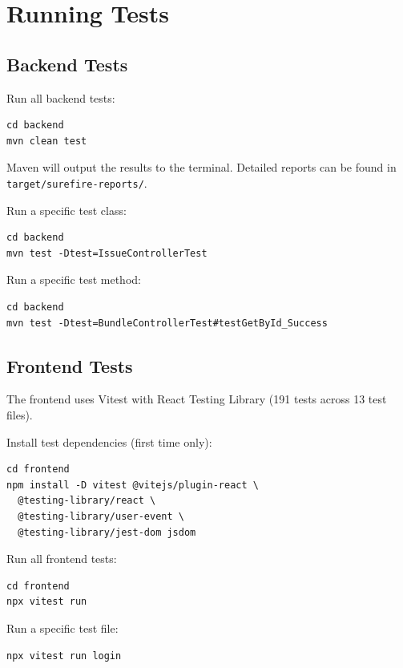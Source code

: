 \documentclass[a4paper,11pt]{article}
\begin{document}
\section{Running Tests}

\subsection{Backend Tests}

Run all backend tests:

\begin{lstlisting}
cd backend
mvn clean test
\end{lstlisting}

Maven will output the results to the terminal. Detailed reports can be found in \texttt{target/surefire-reports/}.

Run a specific test class:

\begin{lstlisting}
cd backend
mvn test -Dtest=IssueControllerTest
\end{lstlisting}

Run a specific test method:

\begin{lstlisting}
cd backend
mvn test -Dtest=BundleControllerTest#testGetById_Success
\end{lstlisting}

\subsection{Frontend Tests}

The frontend uses Vitest with React Testing Library (191 tests across 13 test files).

Install test dependencies (first time only):

\begin{lstlisting}
cd frontend
npm install -D vitest @vitejs/plugin-react \
  @testing-library/react \
  @testing-library/user-event \
  @testing-library/jest-dom jsdom
\end{lstlisting}

Run all frontend tests:

\begin{lstlisting}
cd frontend
npx vitest run
\end{lstlisting}

Run a specific test file:

\begin{lstlisting}
npx vitest run login
\end{lstlisting}
\end{document}
